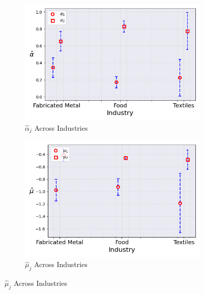 \documentclass{article}
\begin{document}
\begin{figure}[ht!]
    \centering 
    \caption{I.I.D Normal Model Across Industries ($M_0 = 2$)}
    \begin{subfigure}[t]{0.32\textwidth}
        \centering
        \includegraphics[width=\textwidth]{figure/stationary_normal_kmshare_ciiu_alpha_across_industries_m2.png}
        \caption{$\hat\alpha_j$ Across Industries}
    \end{subfigure}
    \begin{subfigure}[t]{0.32\textwidth}
        \centering
        \includegraphics[width=\textwidth]{figure/stationary_normal_kmshare_ciiu_mu_across_industries_m2.png}
        \caption{$\hat\mu_j$ Across Industries}
    \end{subfigure}
 

\end{figure}
\end{document}
